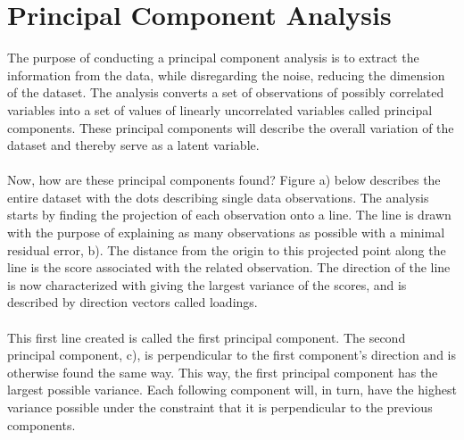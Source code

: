 \section{Principal Component Analysis}
The purpose of conducting a principal component analysis is to extract the information from the data, while disregarding the noise, reducing the dimension of the dataset. The analysis converts a set of observations of possibly correlated variables into a set of values of linearly uncorrelated variables called principal components. These principal components will describe the overall variation of the dataset and thereby serve as a latent variable. 
\\\\
Now, how are these principal components found? Figure a) below describes the entire dataset with the dots describing single data observations. The analysis starts by finding the projection of each observation onto a line. The line is drawn with the purpose of explaining as many observations as possible with a minimal residual error, b). The distance from the origin to this projected point along the line is the score associated with the related observation. The direction of the line is now characterized with giving the largest variance of the scores, and is described by direction vectors called loadings. 
\\\\
This first line created is called the first principal component. The second principal component, c), is perpendicular to the first component’s direction and is otherwise found the same way. This way, the first principal component has the largest possible variance. Each following component will, in turn, have the highest variance possible under the constraint that it is perpendicular to the previous components. 

